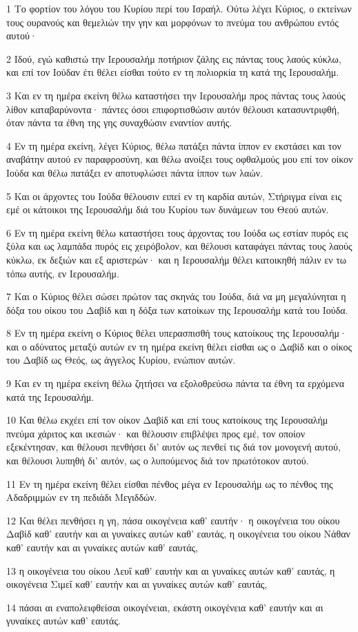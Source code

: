 \par 1 Το φορτίον του λόγου του Κυρίου περί του Ισραήλ. Ούτω λέγει Κύριος, ο εκτείνων τους ουρανούς και θεμελιών την γην και μορφόνων το πνεύμα του ανθρώπου εντός αυτού·
\par 2 Ιδού, εγώ καθιστώ την Ιερουσαλήμ ποτήριον ζάλης εις πάντας τους λαούς κύκλω, και επί τον Ιούδαν έτι θέλει είσθαι τούτο εν τη πολιορκία τη κατά της Ιερουσαλήμ.
\par 3 Και εν τη ημέρα εκείνη θέλω καταστήσει την Ιερουσαλήμ προς πάντας τους λαούς λίθον καταβαρύνοντα· πάντες όσοι επιφορτισθώσιν αυτόν θέλουσι κατασυντριφθή, όταν πάντα τα έθνη της γης συναχθώσιν εναντίον αυτής.
\par 4 Εν τη ημέρα εκείνη, λέγει Κύριος, θέλω πατάξει πάντα ίππον εν εκστάσει και τον αναβάτην αυτού εν παραφροσύνη, και θέλω ανοίξει τους οφθαλμούς μου επί τον οίκον Ιούδα και θέλω πατάξει εν αποτυφλώσει πάντα ίππον των λαών.
\par 5 Και οι άρχοντες του Ιούδα θέλουσιν ειπεί εν τη καρδία αυτών, Στήριγμα είναι εις εμέ οι κάτοικοι της Ιερουσαλήμ διά του Κυρίου των δυνάμεων του Θεού αυτών.
\par 6 Εν τη ημέρα εκείνη θέλω καταστήσει τους άρχοντας του Ιούδα ως εστίαν πυρός εις ξύλα και ως λαμπάδα πυρός εις χειρόβολον, και θέλουσι καταφάγει πάντας τους λαούς κύκλω, εκ δεξιών και εξ αριστερών· και η Ιερουσαλήμ θέλει κατοικηθή πάλιν εν τω τόπω αυτής, εν Ιερουσαλήμ.
\par 7 Και ο Κύριος θέλει σώσει πρώτον τας σκηνάς του Ιούδα, διά να μη μεγαλύνηται η δόξα του οίκου του Δαβίδ και η δόξα των κατοίκων της Ιερουσαλήμ κατά του Ιούδα.
\par 8 Εν τη ημέρα εκείνη ο Κύριος θέλει υπερασπισθή τους κατοίκους της Ιερουσαλήμ· και ο αδύνατος μεταξύ αυτών εν τη ημέρα εκείνη θέλει είσθαι ως ο Δαβίδ και ο οίκος του Δαβίδ ως Θεός, ως άγγελος Κυρίου, ενώπιον αυτών.
\par 9 Και εν τη ημέρα εκείνη θέλω ζητήσει να εξολοθρεύσω πάντα τα έθνη τα ερχόμενα κατά της Ιερουσαλήμ.
\par 10 Και θέλω εκχέει επί τον οίκον Δαβίδ και επί τους κατοίκους της Ιερουσαλήμ πνεύμα χάριτος και ικεσιών· και θέλουσιν επιβλέψει προς εμέ, τον οποίον εξεκέντησαν, και θέλουσι πενθήσει δι' αυτόν ως πενθεί τις διά τον μονογενή αυτού, και θέλουσι λυπηθή δι' αυτόν, ως ο λυπούμενος διά τον πρωτότοκον αυτού.
\par 11 Εν τη ημέρα εκείνη θέλει είσθαι πένθος μέγα εν Ιερουσαλήμ ως το πένθος της Αδαδριμμών εν τη πεδιάδι Μεγιδδών.
\par 12 Και θέλει πενθήσει η γη, πάσα οικογένεια καθ' εαυτήν· η οικογένεια του οίκου Δαβίδ καθ' εαυτήν και αι γυναίκες αυτών καθ' εαυτάς, η οικογένεια του οίκου Νάθαν καθ' εαυτήν και αι γυναίκες αυτών καθ' εαυτάς,
\par 13 η οικογένεια του οίκου Λευΐ καθ' εαυτήν και αι γυναίκες αυτών καθ' εαυτάς, η οικογένεια Σιμεΐ καθ' εαυτήν και αι γυναίκες αυτών καθ' εαυτάς,
\par 14 πάσαι αι εναπολειφθείσαι οικογένειαι, εκάστη οικογένεια καθ' εαυτήν και αι γυναίκες αυτών καθ' εαυτάς.

